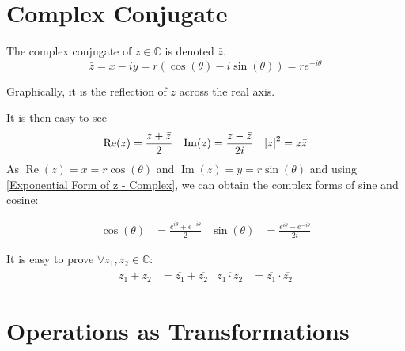 \documentclass[12pt, english]{book}
\begin{document}
	
	\section{Complex Conjugate} \label{Complex Conjugate Section - Complex}
	\begin{definition}
		The complex conjugate of $z \in \mathbb{C}$ is denoted $\bar{z}$.
		$$\bar{z} = x - iy = r(\cos(\theta) - i\sin(\theta)) = re^{-i\theta}$$
		\label{Complex Conjugate}
	\end{definition}
	Graphically, it is the reflection of $z$ across the real axis.
	\begin{center}
	\end{center}
	It is then easy to see
	\begin{align*}
		\operatorname{Re}(z) &= \frac{z + \bar{z}}{2} & \operatorname{Im}(z) &= \frac{z - \bar{z}}{2i} & \abs{z}^2 = z \bar{z}
	\end{align*}
	As $\operatorname{Re}(z) = x = r \cos(\theta)$ and $\operatorname{Im}(z) = y = r \sin(\theta)$ and using \cref{Exponential Form of z - Complex}, we can obtain the complex forms of sine and cosine: 
	\begin{definition}
		\begin{align*}
			\cos(\theta) &= \frac{e^{i \theta} + e^{-i \theta}}{2} 
			&\sin(\theta) &= \frac{e^{i \theta} - e^{-i \theta}}{2i}
		\end{align*}
		\label{Trig Identities - Complex}
	\end{definition}
	It is easy to prove \(\forall z_1, z_2 \in \mathbb{C}\): 
	\begin{align*}
		\overline{z_1 + z_2} &= \overline{z_1} + \overline{z_2} &
		\overline{z_1 \cdot z_2} &= \overline{z_1} \cdot \overline{z_2}
	\end{align*}

	\section{Operations as Transformations} \label{Operations as Transformations Section - Complex}
	
\end{document}
